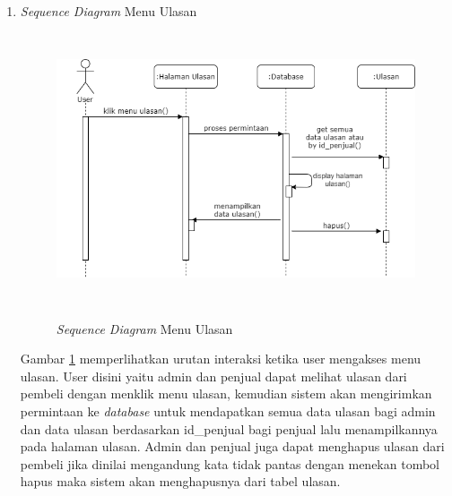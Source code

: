 \begin{enumerate}
	\item \textit{Sequence Diagram} Menu Ulasan
	\begin{figure}[H]
		\centering
		{\includegraphics [width = 11cm, height= 8cm]{gambar/sequence/ulasan}}
		\caption{\textit{Sequence Diagram} Menu Ulasan}
		\label{seq ulasan}
	\end{figure}
	\par Gambar \ref*{seq ulasan} memperlihatkan urutan interaksi ketika user mengakses menu ulasan. User disini yaitu admin dan penjual dapat melihat ulasan dari pembeli dengan menklik menu ulasan, kemudian sistem akan mengirimkan permintaan ke \textit{database} untuk mendapatkan semua data ulasan bagi admin dan data ulasan berdasarkan id\_penjual bagi penjual lalu menampilkannya pada halaman ulasan. Admin dan penjual juga dapat menghapus ulasan dari pembeli jika dinilai mengandung kata tidak pantas dengan menekan tombol hapus maka sistem akan menghapusnya dari tabel ulasan.


\end{enumerate}

